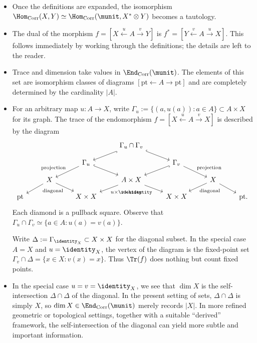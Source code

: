 \begin{example}[Correspondences]
	\begin{itemize}
		\item Once the definitions are expanded, the isomorphism
		$\Hom_{\mathrm{Corr}}(X,Y)\simeq
		\Hom_{\mathrm{Corr}}(\munit,X^*\otimes Y)$ becomes a tautology.
		\item The dual of the morphism
		$f=[X\xleftarrow{u}A\xrightarrow{v}Y]$ is
		$f^*=[Y\xleftarrow{v}A\xrightarrow{u}X]$. This follows immediately by
		working through the definitions; the details are left to the reader.
		\item Trace and dimension take values in
		$\End_{\mathrm{Corr}}(\munit)$. The elements of this set are
		isomorphism classes of diagrams
		$[\mathrm{pt}\leftarrow A\rightarrow\mathrm{pt}]$ and are completely
		determined by the cardinality $|A|$.
		\item For an arbitrary map $u:A\to X$, write
		$\Gamma_u:=\{(a,u(a)):a\in A\}\subset A\times X$ for its graph. The
		trace of the endomorphism $f=[X\xleftarrow{u}A\xrightarrow{v}X]$ is
		described by the diagram
		\[\begin{tikzcd}[row sep=small]
			& & &  \Gamma_u \cap \Gamma_v \arrow[hookrightarrow, ld] \arrow[hookrightarrow, rd] & & & \\
			& & \Gamma_u \arrow[ld, "\text{projection}"'] \arrow[hookrightarrow, rd] & & \Gamma_v \arrow[hookrightarrow, ld] \arrow[rd, "\text{projection}"] & & \\
			& X \arrow[ld] \arrow[rd, "\text{diagonal}"'] & & A \times X \arrow[ld, "{u \times \identity}"] \arrow[rd, "{v \times \identity}"'] & & X \arrow[ld, "\text{diagonal}"] \arrow[rd] & \\
			\mathrm{pt} & & X \times X & & X \times X & & \mathrm{pt}.
		\end{tikzcd}\]
		Each diamond is a pullback square. Observe that
		$\Gamma_u\cap\Gamma_v\simeq\{a\in A:u(a)=v(a)\}$.

		Write $\Delta:=\Gamma_{\identity_X}\subset X\times X$ for the diagonal
		subset. In the special case $A=X$ and $u=\identity_X$, the vertex of
		the diagram is the fixed-point set
		$\Gamma_v\cap\Delta=\{x\in X:v(x)=x\}$. Thus $\Tr(f)$ does nothing but
		count fixed points.

		\item In the special case $u=v=\identity_X$, we see that $\dim X$ is
		the self-intersection $\Delta\cap\Delta$ of the diagonal. In the present
		setting of sets, $\Delta\cap\Delta$ is simply $X$, so
		$\dim X\in\End_{\mathrm{Corr}}(\munit)$ merely records $|X|$. In more
		refined geometric or topological settings, together with a suitable
		``derived'' framework, the self-intersection of the diagonal can yield
		more subtle and important information.
	\end{itemize}
\end{example}

